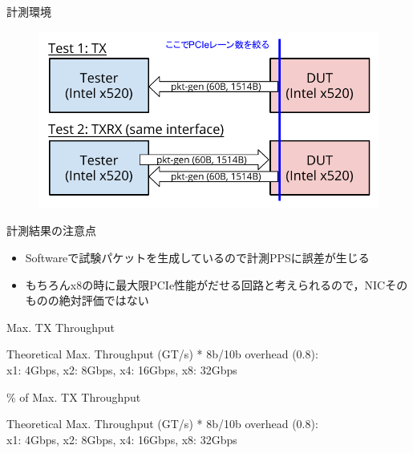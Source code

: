 \documentclass[10pt, compress]{beamer}
\begin{document}
\begin{frame}[fragile,t]{計測環境}

\vspace{-1.5em}
\begin{figure}
\includegraphics[width=.9\textwidth]{fig/test2.pdf}
\end{figure}

\vspace{-1em}

計測結果の注意点
\vspace{-.5em}
\begin{itemize}
\item Softwareで試験パケットを生成しているので計測PPSに誤差が生じる
\item もちろんx8の時に最大限PCIe性能がだせる回路と考えられるので，NICそのものの絶対評価ではない
\end{itemize}

\end{frame}


\begin{frame}{Max. TX Throughput}
	\begin{figure}
		\resizebox{.7\textwidth}{!}{}
	\end{figure}
	{\footnotesize Theoretical Max. Throughput (GT/s) * 8b/10b overhead (0.8): \\
	x1: 4Gbps, x2: 8Gbps, x4: 16Gbps, x8: 32Gbps}
\end{frame}


\begin{frame}{\% of Max. TX Throughput}
	\begin{figure}
		\resizebox{.7\textwidth}{!}{}
	\end{figure}
	{\footnotesize Theoretical Max. Throughput (GT/s) * 8b/10b overhead (0.8): \\
	x1: 4Gbps, x2: 8Gbps, x4: 16Gbps, x8: 32Gbps}
\end{frame}
\end{document}

